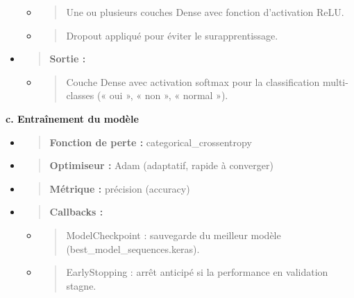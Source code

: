 \documentclass[
]{article}
\begin{document}
\begin{itemize}
  \begin{itemize}
  \item
    \begin{quote}
    Une ou plusieurs couches Dense avec fonction d'activation ReLU.
    \end{quote}
  \item
    \begin{quote}
    Dropout appliqué pour éviter le surapprentissage.
    \end{quote}
  \end{itemize}
\item
  \begin{quote}
  \textbf{Sortie :\\
  }
  \end{quote}

  \begin{itemize}
  \item
    \begin{quote}
    Couche Dense avec activation softmax pour la classification multi-classes (« oui », « non », « normal »).
    \end{quote}
  \end{itemize}
\end{itemize}

\textbf{c. Entraînement du modèle}

\begin{itemize}
\item
  \begin{quote}
  \textbf{Fonction de perte :} categorical\_crossentropy
  \end{quote}
\item
  \begin{quote}
  \textbf{Optimiseur :} Adam (adaptatif, rapide à converger)
  \end{quote}
\item
  \begin{quote}
  \textbf{Métrique :} précision (accuracy)
  \end{quote}
\item
  \begin{quote}
  \textbf{Callbacks :\\
  }
  \end{quote}

  \begin{itemize}
  \item
    \begin{quote}
    ModelCheckpoint : sauvegarde du meilleur modèle (best\_model\_sequences.keras).
    \end{quote}
  \item
    \begin{quote}
    EarlyStopping : arrêt anticipé si la performance en validation stagne.
    \end{quote}
  \end{itemize}
\end{itemize}
\end{document}
